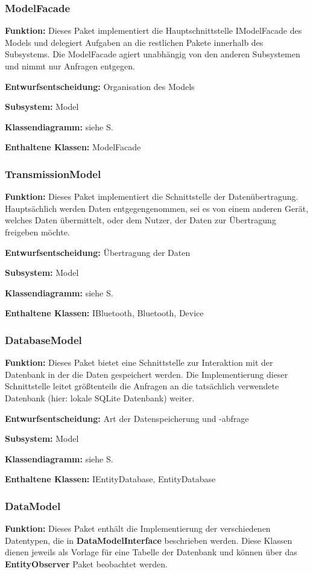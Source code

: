 \documentclass[a4paper]{scrreprt}
\begin{document}
\subsubsection{ModelFacade}
\textbf{Funktion:} Dieses Paket implementiert die Hauptschnittstelle IModelFacade des Models und delegiert Aufgaben an die restlichen Pakete innerhalb des Subsystems.
Die ModelFacade agiert unabhängig von den anderen Subsystemen und nimmt nur Anfragen entgegen.

\textbf{Entwurfsentscheidung:} Organisation des Models

\textbf{Subsystem:} Model

\textbf{Klassendiagramm:} siehe S.

\textbf{Enthaltene Klassen:} ModelFacade

\subsubsection{TransmissionModel}
\textbf{Funktion:} Dieses Paket implementiert die Schnittstelle der Datenübertragung. Hauptsächlich werden Daten entgegengenommen, sei es von einem anderen Gerät, welches Daten übermittelt, oder dem Nutzer, der Daten zur Übertragung freigeben möchte. 

\textbf{Entwurfsentscheidung:} Übertragung der Daten

\textbf{Subsystem:} Model

\textbf{Klassendiagramm:} siehe S.

\textbf{Enthaltene Klassen:} IBluetooth, Bluetooth, Device

\subsubsection{DatabaseModel}
\textbf{Funktion:} Dieses Paket bietet eine Schnittstelle zur Interaktion mit der Datenbank in der die Daten gespeichert werden. 
Die Implementierung dieser Schnittstelle leitet größtenteils die Anfragen an die tatsächlich verwendete Datenbank (hier: lokale SQLite Datenbank) weiter.

\textbf{Entwurfsentscheidung:} Art der Datenspeicherung und -abfrage 

\textbf{Subsystem:} Model

\textbf{Klassendiagramm:} siehe S.

\textbf{Enthaltene Klassen:} IEntityDatabase, EntityDatabase

\subsubsection{DataModel}
\textbf{Funktion:} Dieses Paket enthält die Implementierung der verschiedenen Datentypen, die in \textbf{DataModelInterface} beschrieben werden. 
Diese Klassen dienen jeweils als Vorlage für eine Tabelle der Datenbank und können über das \textbf{EntityObserver} Paket beobachtet werden.
\end{document}
